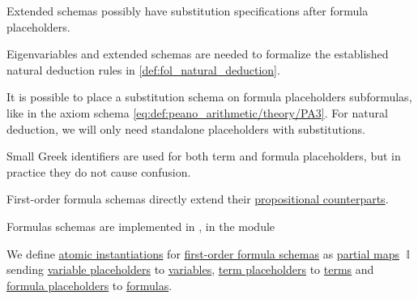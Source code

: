 \begin{comments}
  \item Extended schemas possibly have substitution specifications after formula placeholders.

  \item Eigenvariables and extended schemas are needed to formalize the established natural deduction rules in \cref{def:fol_natural_deduction}.

  \item It is possible to place a substitution schema on formula placeholders subformulas, like in the axiom schema \eqref{eq:def:peano_arithmetic/theory/PA3}. For natural deduction, we will only need standalone placeholders with substitutions.

  \item Small Greek identifiers are used for both term and formula placeholders, but in practice they do not cause confusion.

  \item First-order formula schemas directly extend their \hyperref[def:propositional_formula_schema]{propositional counterparts}.

  \item Formulas schemas are implemented in \cite{notebook:code}, in the module
  \begin{CodeRefDisplay}
  \end{CodeRefDisplay}
\end{comments}

\begin{definition}\label{def:atomic_fol_instantiation}\mimprovised
  We define \hyperref[con:schemas_and_instances]{atomic instantiations} for \hyperref[def:fol_formula_schema]{first-order formula schemas} as \hyperref[def:partial_function]{partial maps} \( \BbbI \) sending \hyperref[def:fol_term_schema]{variable placeholders} to \hyperref[def:fol_term]{variables}, \hyperref[def:fol_term_schema]{term placeholders} to \hyperref[def:fol_term]{terms} and \hyperref[def:fol_formula_schema]{formula placeholders} to \hyperref[def:fol_formula]{formulas}.
\end{definition}

